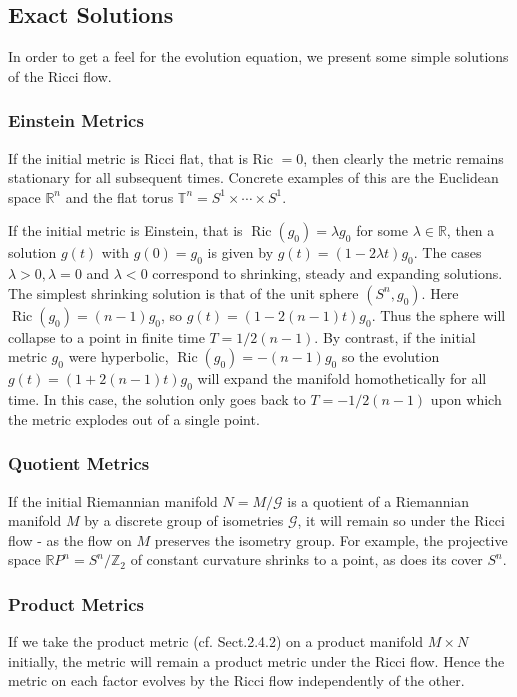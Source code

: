 \documentclass[10pt, letterpaper]{article}
\begin{document}
\pagebreak

\subsection*{Exact Solutions}
In order to get a feel for the evolution equation, we present some simple solutions of the Ricci flow.

\subsubsection*{Einstein Metrics}
If the initial metric is Ricci flat, that is Ric $=0$, then clearly the metric remains stationary for all subsequent times. Concrete examples of this are the Euclidean space $\mathbb{R}^{n}$ and the flat torus $\mathbb{T}^{n}=S^{1} \times \cdots \times S^{1}$.

If the initial metric is Einstein, that is $\operatorname{Ric}\left(g_{0}\right)=\lambda g_{0}$ for some $\lambda \in \mathbb{R}$, then a solution $g(t)$ with $g(0)=g_{0}$ is given by $g(t)=(1-2 \lambda t) g_{0}$. The cases $\lambda>0, \lambda=0$ and $\lambda<0$ correspond to shrinking, steady and expanding solutions. The simplest shrinking solution is that of the unit sphere $\left(S^{n}, g_{0}\right)$. Here $\operatorname{Ric}\left(g_{0}\right)=(n-1) g_{0}$, so $g(t)=(1-2(n-1) t) g_{0}$. Thus the sphere will collapse to a point in finite time $T=1 / 2(n-1)$. By contrast, if the initial metric $g_{0}$ were hyperbolic, $\operatorname{Ric}\left(g_{0}\right)=-(n-1) g_{0}$ so the evolution $g(t)=(1+2(n-1) t) g_{0}$ will expand the manifold homothetically for all time. In this case, the solution only goes back to $T=-1 / 2(n-1)$ upon which the metric explodes out of a single point.

\subsubsection*{Quotient Metrics}
If the initial Riemannian manifold $N=M / \mathcal{G}$ is a quotient of a Riemannian manifold $M$ by a discrete group of isometries $\mathcal{G}$, it will remain so under the Ricci flow - as the flow on $M$ preserves the isometry group. For example, the projective space $\mathbb{R} P^{n}=S^{n} / \mathbb{Z}_{2}$ of constant curvature shrinks to a point, as does its cover $S^{n}$.

\subsubsection*{Product Metrics}
If we take the product metric (cf. Sect.2.4.2) on a product manifold $M \times N$ initially, the metric will remain a product metric under the Ricci flow. Hence the metric on each factor evolves by the Ricci flow independently of the other.
\end{document}
